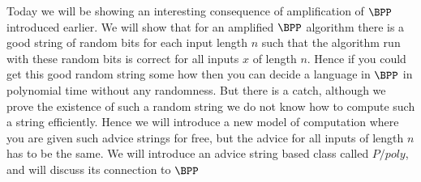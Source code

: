 

Today we will be
  showing an interesting consequence of amplification of $\BPP$
  introduced earlier. We will show that for an amplified $\BPP$
  algorithm there is a good string of random bits for each input
  length $n$ such that the algorithm run with these random bits is
  correct for all inputs $x$ of length $n$. Hence if you could get
  this good random string some how then you can decide a language in
  $\BPP$ in polynomial time without any randomness. But there is a
  catch, although we prove the existence of such a random string we do
  not know how to compute such a string efficiently. Hence we will
  introduce a new model of computation where you are given such advice
  strings for free, but the advice for all inputs of length $n$ has to
  be the same. We will introduce an advice string based class called
  $P/poly$, and will discuss its connection to $\BPP$

